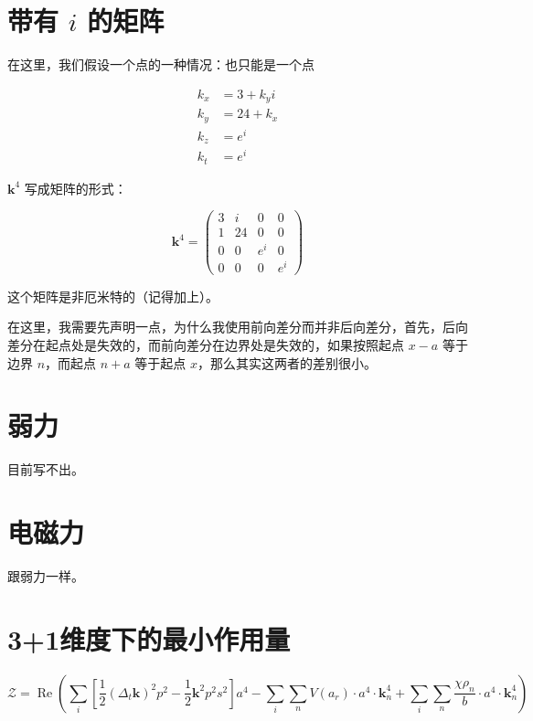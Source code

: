 \documentclass[UTF8]{ctexart}
\begin{document}
\section{带有 \(i\) 的矩阵}

在这里，我们假设一个点的一种情况：也只能是一个点

\begin{align*}
k_x &= 3+k_yi\\
k_y &= 24+k_x\\
k_z &= e^i\\
k_t &= e^i
\end{align*}

\(\mathbf{k}^4\) 写成矩阵的形式：

\begin{equation}
\mathbf{k}^4=
\begin{pmatrix}
3 & i & 0 & 0\\
1 & 24 & 0 & 0\\
0 & 0 & e^i & 0\\
0 & 0 & 0 & e^i
\end{pmatrix}
\end{equation}

这个矩阵是非厄米特的（记得加上）。

在这里，我需要先声明一点，为什么我使用前向差分而并非后向差分，首先，后向差分在起点处是失效的，而前向差分在边界处是失效的，如果按照起点 \(x-a\) 等于边界 \(n\)，而起点 \(n+a\) 等于起点 \(x\)，那么其实这两者的差别很小。

\section{弱力}

目前写不出。

\section{电磁力}

跟弱力一样。

\section{3+1维度下的最小作用量}

\begin{equation}
\mathcal{Z}=\operatorname{Re}\left(\sum_i\left[\frac{1}{2}\left(\Delta_t\mathbf{k}\right)^2p^2-\frac{1}{2}\mathbf{k}^2p^2s^2\right]a^4
-\sum_i\sum_n V(a_r)\cdot a^4\cdot\mathbf{k}^4_n
+\sum_i\sum_n\frac{\chi\rho_n}{b}\cdot a^4\cdot\mathbf{k}^4_n\right)
\end{equation}
\end{document}
